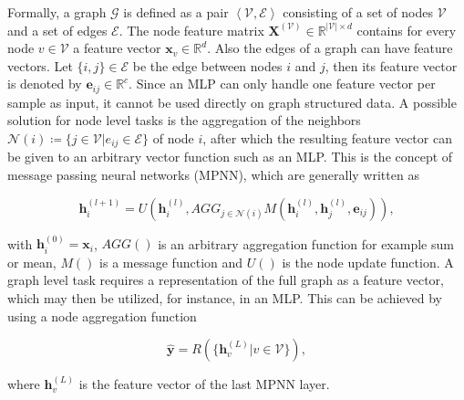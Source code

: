 Formally, a graph $\mathcal{G}$ is defined as a pair $\left<\mathcal{V}, \mathcal{E}\right>$
consisting of a set of nodes $\mathcal{V}$ and a set of edges $\mathcal{E}$.
The node feature matrix $\pmb{X}^{(\mathcal{V})} \in \mathbb{R}^{|\mathcal{V}| \times d}$
contains for every node $v \in \mathcal{V}$ a feature vector $\pmb{x}_v \in \mathbb{R}^d$.
Also the edges of a graph can have feature vectors. Let $\{i,j\} \in \mathcal{E}$ be
the edge between nodes $i$ and $j$, then its feature vector is denoted by
$\pmb{e}_{ij} \in \mathbb{R}^c$.\cite{wu2020comprehensive}
Since an MLP can only handle one feature vector per sample as input, it
cannot be used directly on graph structured data. A possible solution for node 
level tasks is the aggregation of the neighbors $\mathcal{N}(i) \coloneqq \{j \in \mathcal{V} | e_{ij} \in \mathcal{E}\}$ of node $i$,
after which the resulting feature vector can be given to an arbitrary vector function
such as an MLP. This is the concept of message passing neural networks (MPNN), which
are generally written as\cite{gilmer2017neural}


\begin{equation}
	\label{eq:mpnn}
	\pmb{h}^{(l + 1)}_i = U\left(\pmb{h}^{(l)}_i, AGG_{j \in \mathcal{N}(i)} M\left(\pmb{h}^{(l)}_i, \pmb{h}^{(l)}_j, \pmb{e}_{ij}\right)\right),
\end{equation}

with $\pmb{h}^{(0)}_i = \pmb{x}_i$, $AGG()$ is an arbitrary aggregation function
for example sum or mean, $M()$ is a message function and $U()$ is the node update function.
A graph level task requires a representation of the full graph as a feature vector,
which may then be utilized, for instance, in an MLP. This can be achieved by using 
a node aggregation function\cite{gilmer2017neural}


\begin{equation}
	\hat{\pmb{y}} = R(\{\pmb{h}^{(L)}_v | v \in \mathcal{V}\}),
\end{equation}


where $\pmb{h}^{(L)}_v$ is the feature vector of the last MPNN layer.


